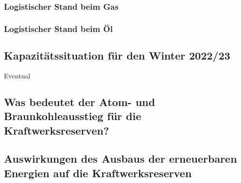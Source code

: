 		\subsubsection{Logistischer Stand beim Gas}
		
		\subsubsection{Logistischer Stand beim Öl}
	
	
	\subsection{Kapazitätssituation für den Winter 2022/23}
	Eventual
	
	
	\subsection{Was bedeutet der Atom- und Braunkohleausstieg für die Kraftwerksreserven?}
	
	
		
	\subsection{Auswirkungen des Ausbaus der erneuerbaren Energien auf die Kraftwerksreserven}